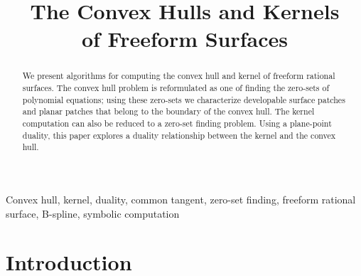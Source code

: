 \documentclass[doublespacing]{elsart}
\begin{document}
\begin{frontmatter}



\title{The Convex Hulls and Kernels\\ of Freeform Surfaces}


\author{}

\address{}

\begin{abstract}

\noindent 
We present algorithms for computing the convex hull and kernel of
freeform rational surfaces.  The convex hull problem is reformulated
as one of finding the zero-sets of polynomial equations;
using these zero-sets
we characterize developable surface patches and planar patches
that belong to the boundary of the convex hull.
The kernel computation can also be reduced to a zero-set finding problem.
Using a plane-point duality, this paper explores a 
duality relationship between the kernel and the convex hull.

\end{abstract}

\begin{keyword}
Convex hull, kernel, duality, common tangent, zero-set finding,
freeform rational surface, B-spline, symbolic computation
\end{keyword}

\end{frontmatter}

\section{Introduction}
\label{sec-introduction}
\end{document}
